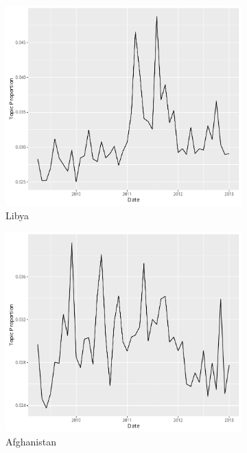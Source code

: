 \documentclass[12pt]{article}
\theoremstyle{definition}
\theoremstyle{algodesc}
\begin{document}
\begin{figure}[htb]
\begin{subfigure}[Libya]{.30\linewidth}
    \includegraphics[width=\linewidth]{../images/time_plot18.pdf}
    \caption{Libya} \label{fig:t3}
\end{subfigure}
\begin{subfigure}[Afghanistan]{.30\linewidth}
    \includegraphics[width=\linewidth]{../images/time_plot27.pdf}
    \caption{Afghanistan} \label{fig:t4}
\end{subfigure}
\begin{subfigure}[Int. Dev.]{.30\linewidth}

\end{subfigure}
\end{figure}
\end{document}

